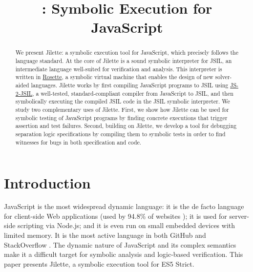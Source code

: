 \documentclass{llncs}
\title{\jilette: Symbolic Execution for JavaScript}
\author{}
\institute{}
\newcommand{\jsil}{JSIL\xspace}
\newcommand{\JSComp}{JS-2-JSIL\xspace}
\newcommand{\jilette}{Jilette\xspace}
\begin{document}
%

\maketitle 

\vspace*{-1.4cm}
\begin{abstract}
We present \jilette: a symbolic execution tool for JavaScript, which precisely follows the language standard. At the core of \jilette is a sound symbolic interpreter for \jsil, an intermediate language well-suited for verification and analysis. This interpreter is written in \underline{Rosette}, %
a symbolic virtual machine that enables the design of new solver-aided languages. 
\jilette works by first compiling JavaScript programs to \jsil using \underline{\JSComp}, %
a well-tested, standard-compliant compiler from JavaScript to \jsil, and then symbolically executing the compiled \jsil code in the \jsil symbolic interpreter. 
We study two complementary uses of \jilette. 
First, we show how \jilette can be used for symbolic testing of JavaScript programs by finding concrete executions that trigger assertion and test failures. 
Second, building on \jilette, we develop a tool for debugging separation logic specifications
by compiling them to symbolic tests in order to find witnesses for bugs in both specification and code.
\vspace*{-0.4cm}
\end{abstract}

\section{Introduction}

\vspace*{-0.2cm}
JavaScript is the most widespread dynamic language: it is the de facto language for client-side Web applications (used by 94.8\% of websites \cite{JS948percent});
it is used for server-side scripting via Node.js; and it is even run on small embedded devices with limited 
memory. It is the most active language in both GitHub \cite{GithubActive} and StackOverflow \cite{SOActive}.
The dynamic nature of JavaScript and its complex semantics make it a difficult target for
symbolic analysis and logic-based verification. 
This paper presents \jilette, a symbolic execution tool for ES5 Strict.
\end{document}

